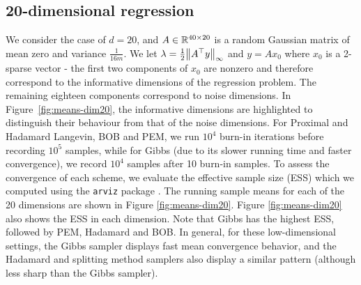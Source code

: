 \documentclass[11pt, twoside]{report}
\begin{document}
\subsection{20-dimensional regression}
We consider the case of $d=20$, and $A\in\mathbb{R}^{40\times 20}$ is a random Gaussian matrix of mean zero and variance $\frac{1}{16m}$. We let $\lambda = \frac12 \norm{A^\top y}_\infty$ and $y=A x_0$ where $x_0$ is a 2-sparse vector - the first two components of $x_0$ are nonzero and therefore correspond to the informative dimensions of the regression problem. The remaining eighteen components correspond to noise dimensions. In Figure~\ref{fig:means-dim20}, the informative dimensions are highlighted to distinguish their behaviour from that of the noise dimensions. For Proximal and Hadamard Langevin, BOB and PEM, we run $10^4$ burn-in iterations before recording $10^5$  samples,  while for Gibbs (due to its slower running time and faster convergence), we record $10^4$ samples after 10 burn-in samples. To assess the convergence of each scheme, we evaluate the effective sample size (ESS) which we computed using the \texttt{arviz} package \cite{arviz_2019}. The running sample means for each of the 20 dimensions are shown in Figure \ref{fig:means-dim20}. Figure \ref{fig:means-dim20} also shows the ESS in each dimension. Note that Gibbs has the highest ESS, followed by PEM, Hadamard and BOB. In general, for these low-dimensional settings, the  Gibbs sampler displays fast mean convergence behavior, and the Hadamard and splitting method samplers also display a similar pattern (although less sharp than the Gibbs sampler).
\end{document}
